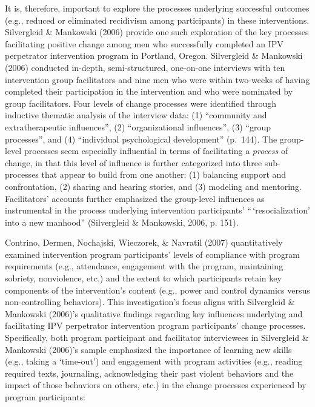 \documentclass[11pt,]{tufte-book}
\begin{document}
It is, therefore, important to explore the processes underlying
successful outcomes (e.g., reduced or eliminated recidivism among
participants) in these interventions. Silvergleid \& Mankowski (2006)
provide one such exploration of the key processes facilitating positive
change among men who successfully completed an IPV perpetrator
intervention program in Portland, Oregon. Silvergleid \& Mankowski
(2006) conducted in-depth, semi-structured, one-on-one interviews with
ten intervention group facilitators and nine men who were within
two-weeks of having completed their participation in the intervention
and who were nominated by group facilitators. Four levels of change
processes were identified through inductive thematic analysis of the
interview data: (1) ``community and extratherapeutic influences'', (2)
``organizational influences'', (3) ``group processes'', and (4)
``individual psychological development'' (p.~144). The group-level
processes seem especially influential in terms of facilitating a
\emph{process} of change, in that this level of influence is further
categorized into three sub-processes that appear to build from one
another: (1) balancing support and confrontation, (2) sharing and
hearing stories, and (3) modeling and mentoring. Facilitators' accounts
further emphasized the group-level influences as instrumental in the
process underlying intervention participants' ``\,`resocialization' into
a new manhood'' (Silvergleid \& Mankowski, 2006, p. 151).

Contrino, Dermen, Nochajski, Wieczorek, \& Navratil (2007)
quantitatively examined intervention program participants' levels of
compliance with program requirements (e.g., attendance, engagement with
the program, maintaining sobriety, nonviolence, etc.) and the extent to
which participants retain key components of the intervention's content
(e.g., power and control dynamics versus non-controlling behaviors).
This investigation's focus aligns with Silvergleid \& Mankowski (2006)'s
qualitative findings regarding key influences underlying and
facilitating IPV perpetrator intervention program participants' change
processes. Specifically, both program participant and facilitator
interviewees in Silvergleid \& Mankowski (2006)'s sample emphasized the
importance of learning new skills (e.g., taking a `time-out') and
engagement with program activities (e.g., reading required texts,
journaling, acknowledging their past violent behaviors and the impact of
those behaviors on others, etc.) in the change processes experienced by
program participants:
\end{document}
